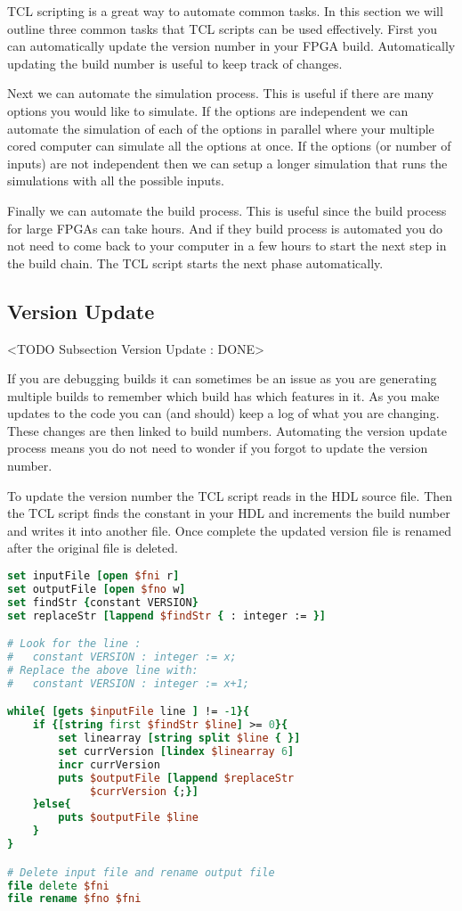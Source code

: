 \ac{TCL} scripting is a great way to automate common tasks. In this section we will outline three common tasks that \ac{TCL} scripts can be used effectively. First you can automatically update the version number in your \ac{FPGA} build. Automatically updating the build number is useful to keep track of changes. 

Next we can automate the simulation process. This is useful if there are many options you would like to simulate. If the options are independent we can automate the simulation of each of the options in parallel where your multiple cored computer can simulate all the options at once. If the options (or number of inputs) are not independent then we can setup a longer simulation that runs the simulations with all the possible inputs.

Finally we can automate the build process. This is useful since the build process for large \ac{FPGA}s can take hours. And if they build process is automated you do not need to come back to your computer in a few hours to start the next step in the build chain. The \ac{TCL} script starts the next phase automatically.

\subsection{Version Update}
	<TODO Subsection Version Update : DONE>

If you are debugging builds it can sometimes be an issue as you are generating multiple builds to remember which build has which features in it. As you make updates to the code you can (and should) keep a log of what you are changing. These changes are then linked to build numbers. Automating the version update process means you do not need to wonder if you forgot to update the version number.
	
To update the version number the \ac{TCL} script reads in the \ac{HDL} source file. Then the \ac{TCL} script finds the constant in your \ac{HDL} and increments the build number and writes it into another file. Once complete the updated version file is renamed after the original file is deleted. 

\begin{lstlisting}[language=tcl]
set inputFile [open $fni r]
set outputFile [open $fno w]
set findStr {constant VERSION}
set replaceStr [lappend $findStr { : integer := }]

# Look for the line :
#   constant VERSION : integer := x;
# Replace the above line with:
#   constant VERSION : integer := x+1;

while{ [gets $inputFile line ] != -1}{
    if {[string first $findStr $line] >= 0}{
        set linearray [string split $line { }]
        set currVersion [lindex $linearray 6]
        incr currVersion
        puts $outputFile [lappend $replaceStr 
             $currVersion {;}]
    }else{
        puts $outputFile $line
    }	
}

# Delete input file and rename output file
file delete $fni
file rename $fno $fni
\end{lstlisting}

